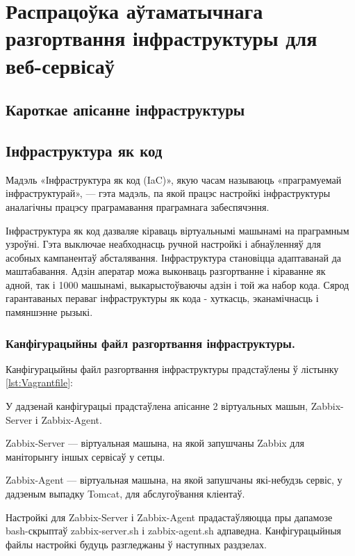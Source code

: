 \section{Распрацоўка аўтаматычнага разгортвання інфраструктуры для веб-сервісаў}

\subsection{Кароткае апісанне інфраструктуры}

\subsection{Інфраструктура як код}
Мадэль «Інфраструктура як код (IaC)», якую часам называюць «праграмуемай інфраструктурай», --- гэта мадэль, па якой працэс настройкі інфраструктуры аналагічны працэсу праграмавання праграмнага забеспячэння.

Інфраструктура як код дазваляе кіраваць віртуальнымі машынамі на праграмным узроўні. Гэта выключае неабходнасць ручной настройкі і абнаўленняў для асобных кампанентаў абсталявання. Інфраструктура становіцца адаптаванай да маштабавання. Адзін аператар можа выконваць разгортванне і кіраванне як адной, так і 1000 машынамі, выкарыстоўваючы адзін і той жа набор кода. Сярод гарантаваных пераваг інфраструктуры як кода - хуткасць, эканамічнасць і памяншэнне рызыкі.

\subsubsection{Канфігурацыйны файл разгортвання інфраструктуры.}
Канфігурацыйны файл разгортвання інфраструктуры прадстаўлены ў лістынку
\ref{lst:Vagrantfile}:



У дадзенай канфігурацыі прадстаўлена апісанне 2 віртуальных машын,
Zabbix-Server і Zabbix-Agent.

Zabbix-Server --- віртуальная машына, на якой запушчаны Zabbix для
маніторынгу іншых сервісаў у сетцы.

Zabbix-Agent --- віртуальная машына, на якой запушчаны які-небудзь сервіс,
у дадзеным выпадку Tomcat, для абслугоўвання кліентаў.

Настройкі для Zabbix-Server і Zabbix-Agent прадастаўляюцца пры дапамозе
bash-скрыптаў zabbix-server.sh і zabbix-agent.sh адпаведна.
Канфігурацыйныя файлы настройкі будуць разгледжаны ў наступных раздзелах.


